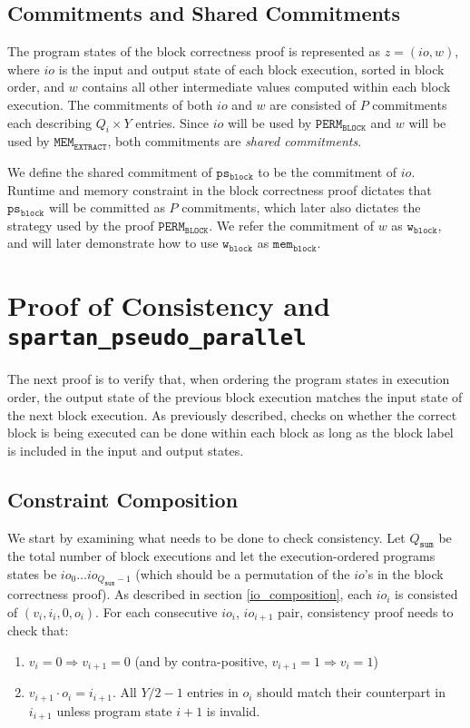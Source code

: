 \documentclass{article}
\newcommand{\code}{\texttt}
\newcommand{\Qsum}{Q_{\mathtt{sum}}}
\newcommand{\PERMB}{\mathtt{PERM_{BLOCK}}}
\newcommand{\MEME}{\mathtt{MEM_{EXTRACT}}}
\newcommand{\psb}{\mathtt{ps_{block}}}
\newcommand{\memb}{\mathtt{mem_{block}}}
\newcommand{\wb}{\mathtt{w_{block}}}
\begin{document}
\subsection{Commitments and Shared Commitments}

The program states of the block correctness proof is represented as $z = (io, w)$, where $io$ is the input and output state of each block execution, sorted in block order, and $w$ contains all other intermediate values computed within each block execution. The commitments of both $io$ and $w$ are consisted of $P$ commitments each describing $Q_i \times Y$ entries. Since $io$ will be used by $\PERMB$ and $w$ will be used by $\MEME$, both commitments are \emph{shared commitments}.

We define the shared commitment of $\psb$ to be the commitment of $io$. Runtime and memory constraint in the block correctness proof dictates that $\psb$ will be committed as $P$ commitments, which later also dictates the strategy used by the proof $\PERMB$. We refer the commitment of $w$ as $\wb$, and will later demonstrate how to use $\wb$ as $\memb$.


\section{Proof of Consistency and \code{spartan\_pseudo\_parallel}}\label{sec:consistency}

The next proof is to verify that, when ordering the program states in execution order, the output state of the previous block execution matches the input state of the next block execution. As previously described, checks on whether the correct block is being executed can be done within each block as long as the block label is included in the input and output states.

\subsection{Constraint Composition}\label{consis_composition}

We start by examining what needs to be done to check consistency. Let $\Qsum$ be the total number of block executions and let the execution-ordered programs states be $io_0 \dots io_{\Qsum - 1}$ (which should be a permutation of the $io$'s in the block correctness proof). As described in section \ref{io_composition}, each $io_i$ is consisted of $(v_i, i_i, 0, o_i)$. For each consecutive $io_i$, $io_{i+1}$ pair, consistency proof needs to check that:
\begin{enumerate}
    \item $v_i = 0 \Rightarrow v_{i + 1} = 0$ (and by contra-positive, $v_{i + 1} = 1 \Rightarrow v_i = 1$)
    \item $v_{i + 1}\cdot o_i = i_{i + 1}$. All $Y / 2 - 1$ entries in $o_i$ should match their counterpart in $i_{i + 1}$ unless program state $i + 1$ is invalid.
\end{enumerate}
\end{document}

